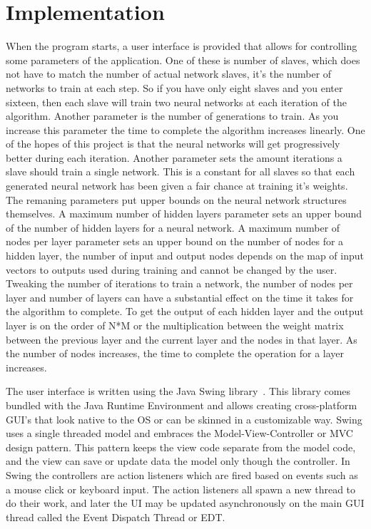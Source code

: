 \section{Implementation}
When the program starts, a user interface is provided that allows for controlling some parameters of the application. One of these is number of slaves, which does not have to match the number of actual network slaves, it's the number of networks to train at each step. So if you have only eight slaves and you enter sixteen, then each slave will train two neural networks at each iteration of the algorithm. Another parameter is the number of generations to train. As you increase this parameter the time to complete the algorithm increases linearly. One of the hopes of this project is that the neural networks will get progressively better during each iteration. Another parameter sets the amount iterations a slave should train a single network. This is a constant for all slaves so that each generated neural network has been given a fair chance at training it's weights. The remaning parameters put upper bounds on the neural network structures themselves. A maximum number of hidden layers parameter sets an upper bound of the number of hidden layers for a neural network. A maximum number of nodes per layer parameter sets an upper bound on the number of nodes for a hidden layer, the number of input and output nodes depends on the map of input vectors to outputs used during training and cannot be changed by the user. Tweaking the number of iterations to train a network, the number of nodes per layer and number of layers can have a substantial effect on the time it takes for the algorithm to complete. To get the output of each hidden layer and the output layer is on the order of N*M or the multiplication between the weight matrix between the previous layer and the current layer and the nodes in that layer. As the number of nodes increases, the time to complete the operation for a layer increases.

The user interface is written using the Java Swing library~\cite{swing}. This library comes bundled with the Java Runtime Environment and allows creating cross-platform GUI's that look native to the OS or can be skinned in a customizable way. Swing uses a single threaded model and embraces the Model-View-Controller or MVC design pattern. This pattern keeps the view code separate from the model code, and the view can save or update data the model only though the controller. In Swing the controllers are action listeners which are fired based on events such as a mouse click or keyboard input. The action listeners all spawn a new thread to do their work, and later the UI may be updated asynchronously on the main GUI thread called the Event Dispatch Thread or EDT.


